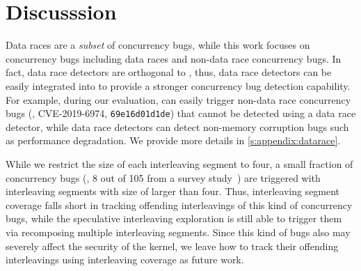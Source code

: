\section{Discusssion}
\label{s:discussion}

%
Data races are a \textit{subset} of concurrency bugs, while this work
focuses on concurrency bugs including data races and non-data race
concurrency bugs.
%
In fact, data race detectors are orthogonal to \sys, thus, data race
detectors can be easily integrated into \sys to provide a stronger
concurrency bug detection capability.
%
For example, during our evaluation, \sys can easily trigger non-data
race concurrency bugs (\eg, CVE-2019-6974, \texttt{69e16d01d1de}) that
cannot be detected using a data race detector, while data race
detectors can detect non-memory corruption bugs such as performance
degradation. We provide more details in \autoref{s:appendix:datarace}.


%
While we restrict the size of each interleaving segment to four, a
small fraction of concurrency bugs (\eg, 8 out of 105 from a survey
study~\cite{learningfrommistakes}) are triggered with interleaving
segments with size of larger than four.
%
Thus, interleaving segment coverage falls short in tracking offending
interleavings of this kind of concurrency bugs, while the speculative
interleaving exploration is still able to trigger them via recomposing
multiple interleaving segments.
%
Since this kind of bugs also may severely affect the security of the
kernel, we leave how to track their offending interleavings using
interleaving coverage as future work.

